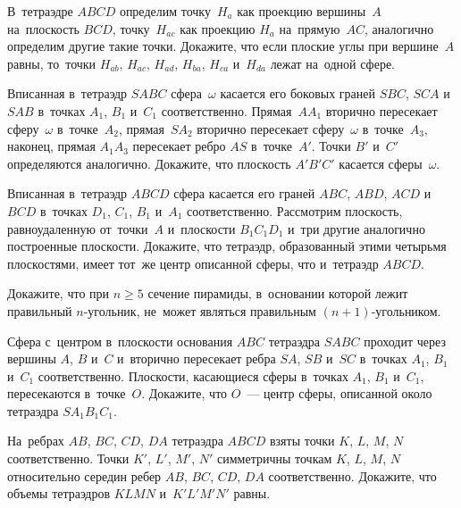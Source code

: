 \begin{problems}

\item
В~тетраэдре $ABCD$ определим
точку~$H_{a}$ как проекцию вершины~$A$ на~плоскость $BCD$,
точку~$H_{ac}$ как проекцию $H_{a}$ на~прямую~$AC$,
аналогично определим другие такие точки.
Докажите, что если плоские углы при вершине~$A$ равны, то~точки
$H_{ab}$, $H_{ac}$, $H_{ad}$, $H_{ba}$, $H_{ca}$ и~$H_{da}$ лежат на~одной
сфере.

\item
Вписанная в~тетраэдр $SABC$ сфера~$\omega$ касается его боковых граней
$SBC$, $SCA$ и~$SAB$ в~точках $A_1$, $B_1$ и~$C_1$ соответственно.
Прямая~$A A_1$ вторично пересекает сферу~$\omega$ в~точке~$A_2$,
прямая~$S A_2$ вторично пересекает сферу~$\omega$ в~точке~$A_3$, наконец,
прямая $A_1 A_3$ пересекает ребро $AS$ в~точке~$A'$.
Точки $B'$ и~$C'$ определяются аналогично.
Докажите, что плоскость $A'B'C'$ касается сферы~$\omega$.

\item
Вписанная в~тетраэдр $ABCD$ сфера касается его граней
$ABC$, $ABD$, $ACD$ и~$BCD$ в~точках $D_1$, $C_1$, $B_1$ и~$A_1$
соответственно.
Рассмотрим плоскость, равноудаленную от~точки~$A$ и~плоскости $B_1 C_1 D_1$
и~три другие аналогично построенные плоскости.
Докажите, что тетраэдр, образованный этими четырьмя плоскостями, имеет тот~же
центр описанной сферы, что и~тетраэдр $ABCD$.

\item
Докажите, что при $n \geq 5$ сечение пирамиды, в~основании которой лежит
правильный $n$-угольник, не~может являться правильным $(n + 1)$-угольником.

\item
Сфера с~центром в~плоскости основания $ABC$ тетраэдра $SABC$ проходит через
вершины $A$, $B$ и~$C$ и~вторично пересекает ребра $SA$, $SB$ и~$SC$ в~точках
$A_1$, $B_1$ и~$C_1$ соответственно.
Плоскости, касающиеся сферы в~точках $A_1$, $B_1$ и~$C_1$, пересекаются
в~точке~$O$.
Докажите, что $O$~— центр сферы, описанной около тетраэдра $S A_1 B_1 C_1$.

\item
На~ребрах $AB$, $BC$, $CD$, $DA$ тетраэдра $ABCD$ взяты точки
$K$, $L$, $M$, $N$ соответственно.
Точки $K'$, $L'$, $M'$, $N'$ симметричны точкам $K$, $L$, $M$, $N$ относительно
середин ребер $AB$, $BC$, $CD$, $DA$ соответственно.
Докажите, что объемы тетраэдров $KLMN$ и~$K'L'M'N'$ равны.

\end{problems}

\fi

